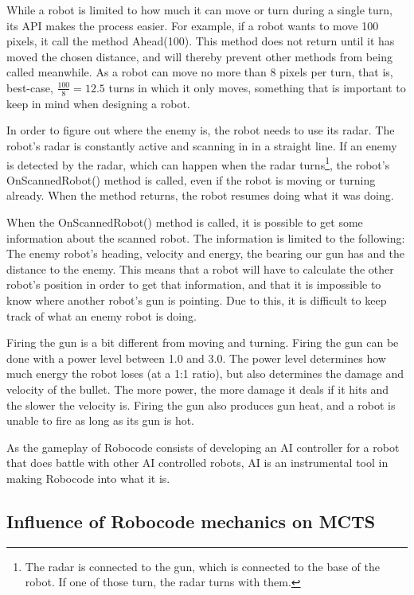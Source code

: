 While a robot is limited to how much it can move or turn during a single turn, its API\cite{robocodeAPI} makes the process easier. For example, if a robot wants to move 100 pixels, it call the method Ahead(100). This method does not return until it has moved the chosen distance, and will thereby prevent other methods from being called meanwhile. As a robot can move no more than 8 pixels per turn, that is, best-case, $\frac{100}{8} = 12.5$ turns in which it only moves, something that is important to keep in mind when designing a robot.

In order to figure out where the enemy is, the robot needs to use its radar. The robot's radar is constantly active and scanning in in a straight line. If an enemy is detected by the radar, which can happen when the radar turns\footnote{The radar is connected to the gun, which is connected to the base of the robot. If one of those turn, the radar turns with them.}, the robot's OnScannedRobot() method is called, even if the robot is moving or turning already. When the method returns, the robot resumes doing what it was doing.

When the OnScannedRobot() method is called, it is possible to get some information about the scanned robot. The information is limited to the following: The enemy robot's heading, velocity and energy, the bearing our gun has and the distance to the enemy. This means that a robot will have to calculate the other robot's position in order to get that information, and that it is impossible to know where another robot's gun is pointing. Due to this, it is difficult to keep track of what an enemy robot is doing.

Firing the gun is a bit different from moving and turning. Firing the gun can be done with a power level between 1.0 and 3.0. The power level determines how much energy the robot loses (at a 1:1 ratio), but also determines the damage and velocity of the bullet. The more power, the more damage it deals if it hits and the slower the velocity is. Firing the gun also produces gun heat, and a robot is unable to fire as long as its gun is hot.

As the gameplay of Robocode consists of developing an AI controller for a robot that does battle with other AI controlled robots, AI is an instrumental tool in making Robocode into what it is.


\subsection{Influence of Robocode mechanics on MCTS}
\label{03_01}


